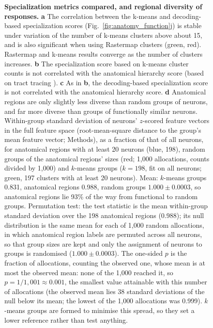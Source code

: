 \FloatBarrier



\begin{figure}
\begin{fullwidth}
\caption{\textbf{Specialization metrics compared, and regional diversity of responses.}
\textbf{a} The correlation between the k-means and decoding-based specialization scores (Fig.~\ref{fig:anatomy_function}j) is stable under variation of the number of k-means clusters above about 15, and is also significant when using Rastermap clusters (green, red). Rastermap and k-means results converge as the number of clusters increases.
\textbf{b} The specialization score based on k-means cluster counts is not correlated with the anatomical hierarchy score (based on tract tracing \cite{harris2019hierarchical}).
\textbf{c} As in \textbf{b}, the decoding-based specialization score is not correlated with the anatomical hierarchy score.
\textbf{d} Anatomical regions are only slightly less diverse than random groups of neurons, and far more diverse than groups of functionally similar neurons. Within-group standard deviation of neurons' $z$-scored feature vectors in the full feature space (root-mean-square distance to the group's mean feature vector; Methods), as a fraction of that of all neurons, for anatomical regions with at least 20 neurons (blue, 198), random groups of the anatomical regions' sizes (red; 1,000 allocations, counts divided by 1,000) and $k$-means groups ($k=198$, fit on all neurons; green, 197 clusters with at least 20 neurons). Mean: $k$-means groups 0.831, anatomical regions 0.988, random groups $1.000\pm0.0003$, so anatomical regions lie 93\% of the way from functional to random groups. Permutation test: the test statistic is the mean within-group standard deviation over the 198 anatomical regions (0.988); its null distribution is the same mean for each of 1,000 random allocations, in which anatomical region labels are permuted across all neurons, so that group sizes are kept and only the assignment of neurons to groups is randomised ($1.000\pm0.0003$). The one-sided $p$ is the fraction of allocations, counting the observed one, whose mean is at most the observed mean: none of the 1,000 reached it, so $p=1/1{,}001\approx0.001$, the smallest value attainable with this number of allocations (the observed mean lies 38 standard deviations of the null below its mean; the lowest of the 1,000 allocations was 0.999). $k$-means groups are formed to minimise this spread, so they set a lower reference rather than test anything.
}    
\label{fig:specialization_metrics}
\end{fullwidth}
\end{figure}


